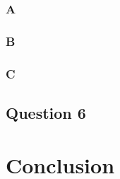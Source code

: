 \documentclass[a4paper, 11pt, oneside]{article}
\begin{document}
\subsubsection{A}

\subsubsection{B}

\subsubsection{C}

\subsection{Question 6}

\section*{Conclusion}
\end{document}
